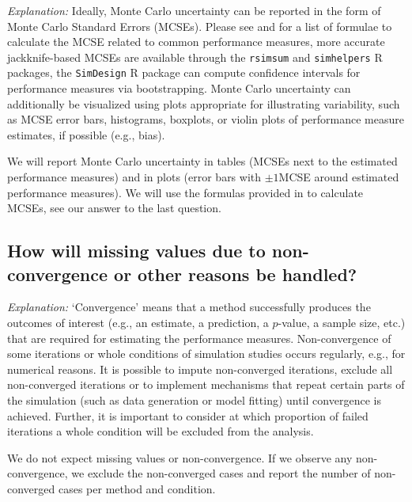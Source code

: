 \documentclass[12pt]{article}
\begin{document}
\textit{Explanation:} Ideally, Monte Carlo uncertainty can be reported in the form of Monte Carlo Standard Errors (MCSEs). Please see \textcite{Siepe2023} and \textcite{Morris2019} for a list of formulae to calculate the MCSE related to common performance measures, more accurate jackknife-based MCSEs are available through the \texttt{rsimsum} \parencite{Gasparini2018} and \texttt{simhelpers} \parencite{Simhelpers2022} R packages, the \texttt{SimDesign} \parencite{Chalmers2020} R package can compute confidence intervals for performance measures via bootstrapping. Monte Carlo uncertainty can additionally be visualized using plots appropriate for illustrating variability, such as MCSE error bars, histograms, boxplots, or violin plots of performance measure estimates, if possible (e.g., bias). 
    
\begin{examplebox}
We will report Monte Carlo uncertainty in tables (MCSEs next to the estimated performance measures) and in plots (error bars with $\pm 1$MCSE around estimated performance measures). We will use the formulas provided in \textcite{Siepe2023} to calculate MCSEs, see our answer to the last question.
\end{examplebox}

\subsection{How will missing values due to non-convergence or other reasons be handled?}
    
\textit{Explanation:} `Convergence' means that a method successfully produces the outcomes of interest (e.g., an estimate, a prediction, a $p$-value, a sample size, etc.) that are required for estimating the performance measures. Non-convergence of some iterations or whole conditions of simulation studies occurs regularly, e.g., for numerical reasons. It is possible to impute non-converged iterations, exclude all non-converged iterations or to implement mechanisms that repeat certain parts of the simulation (such as data generation or model fitting) until convergence is achieved. Further, it is important to consider at which proportion of failed iterations a whole condition will be excluded from the analysis. 
    
\begin{examplebox}
We do not expect missing values or non-convergence. If we observe any non-convergence, we exclude the non-converged cases and report the number of non-converged cases per method and condition.
\end{examplebox}
\end{document}
